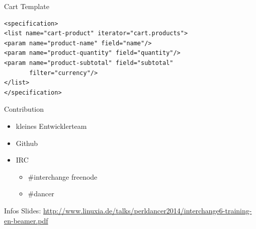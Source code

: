 \begin{frame}[fragile]{Cart Template}
\begin{lstlisting}
<specification>
<list name="cart-product" iterator="cart.products">
<param name="product-name" field="name"/>
<param name="product-quantity" field="quantity"/>
<param name="product-subtotal" field="subtotal" 
       filter="currency"/>
</list>
</specification>
\end{lstlisting}
\end{frame}

\begin{frame}{Contribution}
\begin{itemize}
\item kleines Entwicklerteam
\item Github
\item IRC 
\begin{itemize}
\item \#interchange freenode
\item \#dancer
\end{itemize}
\end{itemize}
\end{frame}

\begin{frame}{Infos}
Slides:
\url{http://www.linuxia.de/talks/perldancer2014/interchange6-training-en-beamer.pdf}
\end{frame}



